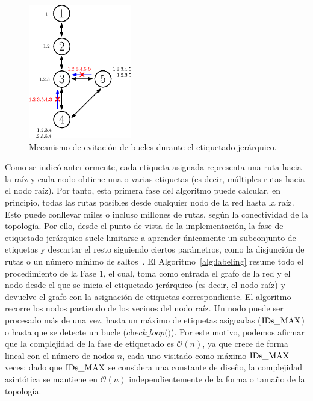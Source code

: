 \begin{figure}[ht!]
    \centering
    \includegraphics[width=0.4\textwidth]{fig/05_den2ne/den2ne_04.eps}
    \caption{Mecanismo de evitación de bucles durante el etiquetado jerárquico.}
    \label{fig:den2ne_04}
\end{figure}

Como se indicó anteriormente, cada etiqueta asignada representa una ruta hacia la raíz y cada nodo obtiene una o varias etiquetas (es decir, múltiples rutas hacia el nodo raíz). Por tanto, esta primera fase del algoritmo puede calcular, en principio, todas las rutas posibles desde cualquier nodo de la red hasta la raíz. Esto puede conllevar miles o incluso millones de rutas, según la conectividad de la topología. Por ello, desde el punto de vista de la implementación, la fase de etiquetado jerárquico suele limitarse a aprender únicamente un subconjunto de etiquetas y descartar el resto siguiendo ciertos parámetros, como la disjunción de rutas o un número mínimo de saltos~\cite{Lopez-Pajares19}. El Algoritmo~\ref{alg:labeling} resume todo el procedimiento de la Fase 1, el cual, toma como entrada el grafo de la red y el nodo desde el que se inicia el etiquetado jerárquico (es decir, el nodo raíz) y devuelve el grafo con la asignación de etiquetas correspondiente. El algoritmo recorre los nodos partiendo de los vecinos del nodo raíz. Un nodo puede ser procesado más de una vez, hasta un máximo de etiquetas asignadas (\(\textup{IDs\_MAX}\)) o hasta que se detecte un bucle (\(\textit{check\_loop()}\)). Por este motivo, podemos afirmar que la complejidad de la fase de etiquetado es \(\mathcal{O}(n)\), ya que crece de forma lineal con el número de nodos \(n\), cada uno visitado como máximo \(\textup{IDs\_MAX}\) veces; dado que \(\textup{IDs\_MAX}\) se considera una constante de diseño, la complejidad asintótica se mantiene en \(\mathcal{O}(n)\) independientemente de la forma o tamaño de la topología.


